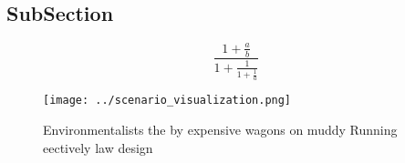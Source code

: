 \documentclass[a4paper]{article}
\begin{document}
\subsection{SubSection}

\[ \frac{1+\frac{a}{b}}{1+\frac{1}{1+\frac{1}{a}}} \]

\begin{figure}
\centering
\texttt{[image: ../scenario\_visualization.png]}
\caption{Environmentalists the by expensive wagons on muddy Running eectively law design
}
\end{figure}
 
\end{document}
